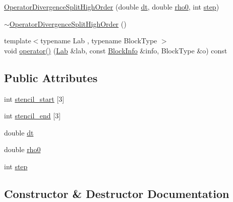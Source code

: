 \begin{DoxyCompactItemize}
\hyperlink{struct_operator_divergence_split_high_order_a707ec7a6c74a6d965fdbd026e5a3c7c9}{Operator\+Divergence\+Split\+High\+Order} (double \hyperlink{struct_operator_divergence_split_high_order_a2e04249619ee9b0fdb81dbb23795bb37}{dt}, double \hyperlink{struct_operator_divergence_split_high_order_a7654e14cf9e52e8c0f4a57b5ec62c1c0}{rho0}, int \hyperlink{struct_operator_divergence_split_high_order_abcbe4e231301629b5a48c5f0b789af2b}{step})
\item 
\hyperlink{struct_operator_divergence_split_high_order_a7eaeb8f57838ea962dcf91b60094e5ae}{$\sim$\+Operator\+Divergence\+Split\+High\+Order} ()
\item 
{\footnotesize template$<$typename Lab , typename Block\+Type $>$ }\\void \hyperlink{struct_operator_divergence_split_high_order_ac60d292305a45684efcf88b0e9fc1618}{operator()} (\hyperlink{_definitions_8h_ad6f951af9a2a6ebc1975404882b34314}{Lab} \&lab, const \hyperlink{struct_block_info}{Block\+Info} \&info, Block\+Type \&o) const 
\end{DoxyCompactItemize}
\subsection*{Public Attributes}
\begin{DoxyCompactItemize}
\item 
int \hyperlink{struct_operator_divergence_split_high_order_a515b56b79c9da531fa0164946a497f04}{stencil\+\_\+start} \mbox{[}3\mbox{]}
\item 
int \hyperlink{struct_operator_divergence_split_high_order_a1539bfea9c833b7d7ddf481509a417cd}{stencil\+\_\+end} \mbox{[}3\mbox{]}
\item 
double \hyperlink{struct_operator_divergence_split_high_order_a2e04249619ee9b0fdb81dbb23795bb37}{dt}
\item 
double \hyperlink{struct_operator_divergence_split_high_order_a7654e14cf9e52e8c0f4a57b5ec62c1c0}{rho0}
\item 
int \hyperlink{struct_operator_divergence_split_high_order_abcbe4e231301629b5a48c5f0b789af2b}{step}
\end{DoxyCompactItemize}


\subsection{Constructor \& Destructor Documentation}
\hypertarget{struct_operator_divergence_split_high_order_a707ec7a6c74a6d965fdbd026e5a3c7c9}{}

